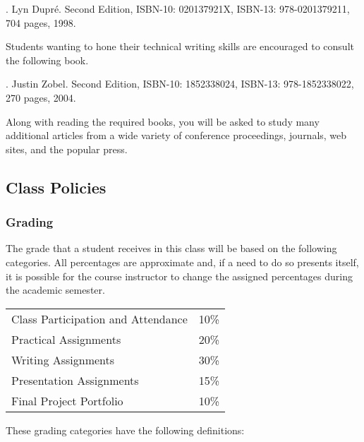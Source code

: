 . Lyn Dupr\'e. Second Edition, ISBN-10: 020137921X,
ISBN-13: 978-0201379211, 704 pages, 1998.

\noindent
Students wanting to hone their technical writing skills are encouraged to consult the following book.

. Justin Zobel. Second Edition, ISBN-10: 1852338024, ISBN-13:
978-1852338022, 270 pages, 2004.

\noindent Along with reading the required books, you will be asked to study many additional articles from a wide variety
of conference proceedings, journals, web sites, and the popular press.

\subsection*{Class Policies}

\subsubsection*{Grading}

The grade that a student receives in this class will be based on the following categories. All percentages are
approximate and, if a need to do so presents itself, it is possible for the course instructor to change the assigned
percentages during the academic semester.

\begin{center}
\begin{tabular}{ll}

Class Participation and Attendance & 10\% \\
Practical Assignments              & 20\% \\
Writing Assignments                & 30\% \\
Presentation Assignments           & 15\% \\
Final Project Portfolio            & 10\%

\end{tabular}
\end{center}

\noindent
\vspace*{-.1in}
These grading categories have the following definitions:

